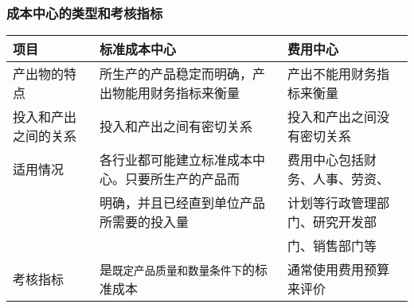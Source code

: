 \documentclass[11pt]{article}
\begin{document}
\subsubsection{成本中心的类型和考核指标}
\label{sec:orga964fe3}
\begin{center}
\begin{tabular}{lll}
项目 & 标准成本中心 & 费用中心\\
\hline
产出物的特点 & 所生产的产品稳定而明确，产出物能用财务指标来衡量 & 产出不能用财务指标来衡量\\
\hline
投入和产出之间的关系 & 投入和产出之间有密切关系 & 投入和产出之间没有密切关系\\
\hline
适用情况 & 各行业都可能建立标准成本中心。只要所生产的产品而 & 费用中心包括财务、人事、劳资、\\
 & 明确，并且已经直到单位产品所需要的投入量 & 计划等行政管理部门、研究开发部\\
 &  & 门、销售部门等\\
\hline
考核指标 & 是\texttt{既定产品质量和数量条件下}的标准成本 & 通常使用费用预算来评价\\
\end{tabular}
\end{center}
\end{document}
